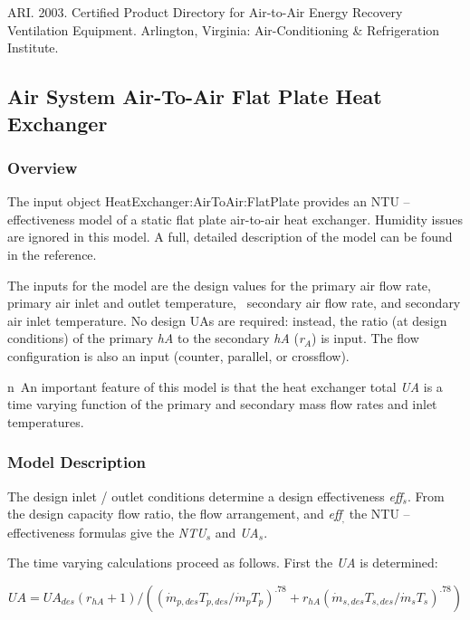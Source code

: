 ARI. 2003. Certified Product Directory for Air-to-Air Energy Recovery Ventilation Equipment. Arlington, Virginia: Air-Conditioning \& Refrigeration Institute.

\subsection{Air System Air-To-Air Flat Plate Heat Exchanger}\label{air-system-air-to-air-flat-plate-heat-exchanger}

\subsubsection{Overview}\label{overview-1-007}

The input object HeatExchanger:AirToAir:FlatPlate provides an NTU -- effectiveness model of a static flat plate air-to-air heat exchanger. Humidity issues are ignored in this model. A full, detailed description of the model can be found in the reference.

The inputs for the model are the design values for the primary air flow rate, primary air inlet and outlet temperature,~ secondary air flow rate, and secondary air inlet temperature. No design UAs are required: instead, the ratio (at design conditions) of the primary \emph{hA} to the secondary \emph{hA} (\emph{r\(_{A}\)}) is input. The flow configuration is also an input (counter, parallel, or crossflow).

n~An important feature of this model is that the heat exchanger total \emph{UA} is a time varying function of the primary and secondary mass flow rates and inlet temperatures.

\subsubsection{Model Description}\label{model-description-1-007}

The design inlet / outlet conditions determine a design effectiveness \emph{eff}\(_{s}\). From the design capacity flow ratio, the flow arrangement, and \emph{eff}\(_{,}\) the NTU -- effectiveness formulas give the \emph{NTU\(_{s}\)} and \emph{UA\(_{s}\)}.

The time varying calculations proceed as follows. First the \emph{UA} is determined:

\begin{equation}
UA = U{A_{des}}({r_{hA}} + 1)/({({\dot m_{p,des}}{T_{p,des}}/{\dot m_p}{T_p})^{.78}} + {r_{hA}}{({\dot m_{s,des}}{T_{s,des}}/{\dot m_s}{T_s})^{.78}})
\end{equation}

